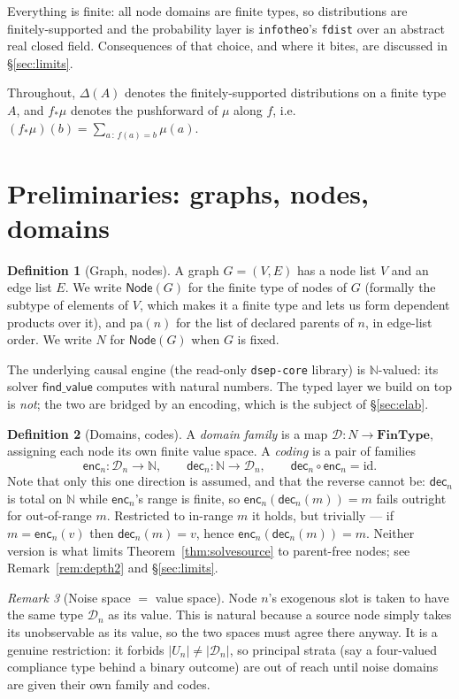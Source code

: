 \documentclass[11pt,a4paper]{article}
\theoremstyle{definition}
\newtheorem{definition}{Definition}[section]
\theoremstyle{plain}
\theoremstyle{remark}
\newtheorem{remark}[definition]{Remark}
\newcommand{\Node}{\mathsf{Node}}
\newcommand{\pa}{\mathrm{pa}}
\newcommand{\dom}{\mathcal{D}}
\newcommand{\enc}{\mathsf{enc}}
\newcommand{\dect}{\mathsf{dec}}
\newcommand{\fv}{\mathsf{find\_value}}
\newcommand{\Dist}[1]{\Delta(#1)}      %
\newcommand{\push}[1]{{#1}_{*}}        %
\newcommand{\id}{\mathrm{id}}
\begin{document}
Everything is finite: all node domains are finite types, so distributions
are finitely-supported and the probability layer is
\texttt{infotheo}'s \texttt{fdist} over an abstract real closed field.
Consequences of that choice, and where it bites, are discussed in
\S\ref{sec:limits}.

Throughout, $\Dist{A}$ denotes the finitely-supported distributions on a
finite type $A$, and $\push{f}\mu$ denotes the pushforward of $\mu$ along
$f$, i.e.\ $(\push{f}\mu)(b) = \sum_{a\,:\,f(a)=b}\mu(a)$.

\section{Preliminaries: graphs, nodes, domains}

\begin{definition}[Graph, nodes]
A graph $G=(V,E)$ has a node list $V$ and an edge list $E$. We write
$\Node(G)$ for the finite type of nodes of $G$ (formally the subtype of
elements of $V$, which makes it a finite type and lets us form dependent
products over it), and $\pa(n)$ for the list of declared parents of $n$,
in edge-list order. We write $N$ for $\Node(G)$ when $G$ is fixed.
\end{definition}

The underlying causal engine (the read-only \texttt{dsep-core} library) is
$\mathbb{N}$-valued: its solver $\fv$ computes with natural numbers. The
typed layer we build on top is \emph{not}; the two are bridged by an
encoding, which is the subject of \S\ref{sec:elab}.

\begin{definition}[Domains, codes]
A \emph{domain family} is a map $\dom : N \to \mathbf{FinType}$, assigning
each node its own finite value space. A \emph{coding} is a pair of families
\[
  \enc_n : \dom_n \to \mathbb{N},
  \qquad
  \dect_n : \mathbb{N} \to \dom_n,
  \qquad
  \dect_n \circ \enc_n = \id .
\]
Note that only this one direction is assumed, and that the reverse cannot
be: $\dect_n$ is total on $\mathbb{N}$ while $\enc_n$'s range is finite, so
$\enc_n(\dect_n(m)) = m$ fails outright for out-of-range $m$. Restricted to
in-range $m$ it holds, but trivially --- if $m = \enc_n(v)$ then
$\dect_n(m) = v$, hence $\enc_n(\dect_n(m)) = m$. Neither version is what
limits Theorem~\ref{thm:solvesource} to parent-free nodes; see
Remark~\ref{rem:depth2} and \S\ref{sec:limits}.
\end{definition}

\begin{remark}[Noise space $=$ value space]
Node $n$'s exogenous slot is taken to have the same type $\dom_n$ as its
value. This is natural because a source node simply takes its unobservable
as its value, so the two spaces must agree there anyway. It is a genuine
restriction: it forbids $|U_n| \neq |\dom_n|$, so principal strata (say a
four-valued compliance type behind a binary outcome) are out of reach until
noise domains are given their own family and codes.
\end{remark}
\end{document}
